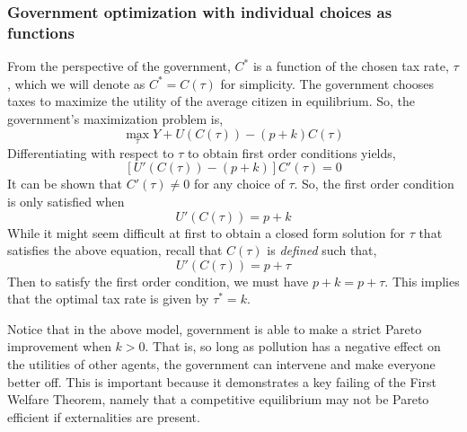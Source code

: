 \subsubsection*{Government optimization with individual choices as functions}
From the perspective of the government, $C^*$ is a function of the chosen tax rate, $\tau$, which we will denote as $C^* = C(\tau)$ for simplicity. The government chooses taxes to maximize the utility of the average citizen in equilibrium. So, the government's maximization problem is,
\begin{equation*}
    \max_{\tau} Y + U(C(\tau)) - (p + k) C(\tau)
\end{equation*}
Differentiating with respect to $\tau$ to obtain first order conditions yields,
\begin{equation*}
    \left[U'(C(\tau)) - (p + k)\right]C'(\tau) = 0
\end{equation*}
It can be shown that $C'(\tau) \neq 0$ for any choice of $\tau$. So, the first order condition is only satisfied when
\begin{equation*}
    U'(C(\tau)) = p + k
\end{equation*}
While it might seem difficult at first to obtain a closed form solution for $\tau$ that satisfies the above equation, recall that $C(\tau)$ is \emph{defined} such that,
\begin{equation*}
    U'(C(\tau)) = p + \tau
\end{equation*}
Then to satisfy the first order condition, we must have $p + k = p + \tau$. This implies that the optimal tax rate is given by $\tau^* = k$. 

Notice that in the above model, government is able to make a strict Pareto improvement when $k > 0$. That is, so long as pollution has a negative effect on the utilities of other agents, the government can intervene and make everyone better off. This is important because it demonstrates a key failing of the First Welfare Theorem, namely that a competitive equilibrium may not be Pareto efficient if externalities are present. 
